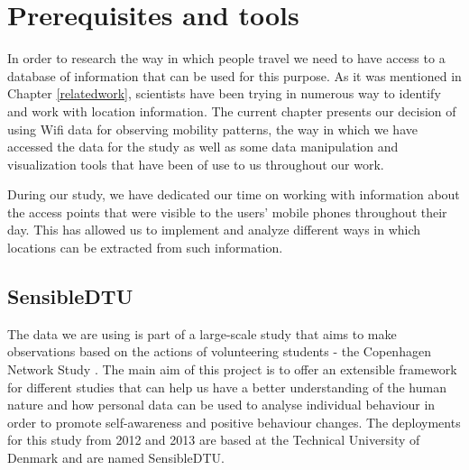 \chapter{Prerequisites and tools}
In order to research the way in which people travel we need to have access to a
database of information that can be used for this purpose. As it was mentioned
in Chapter \ref{relatedwork}, scientists have been trying in numerous way to
identify and work with location information. The current chapter presents our
decision of using Wifi data for observing mobility patterns, the way in which we
have accessed the data for the study as well as some data manipulation and
visualization tools that have been of use to us throughout our work.

During our study, we have dedicated our time on working with information about
the access points that were visible to the users' mobile phones throughout their
day. This has allowed us to implement and analyze different ways in which
locations can be extracted from such information.

\section{SensibleDTU}
\label{sensible_dtu}

The data we are using is part of a large-scale study that aims to make
observations based on the actions of volunteering students - the Copenhagen
Network Study \cite{Stopczynski14m}. The main aim of this project is to offer an
extensible framework for different studies that can help us have a better
understanding of the human nature and how personal data can be used to analyse
individual behaviour in order to promote self-awareness and positive behaviour
changes. The deployments for this study from 2012 and 2013 are based at the
Technical University of Denmark and are named SensibleDTU.

